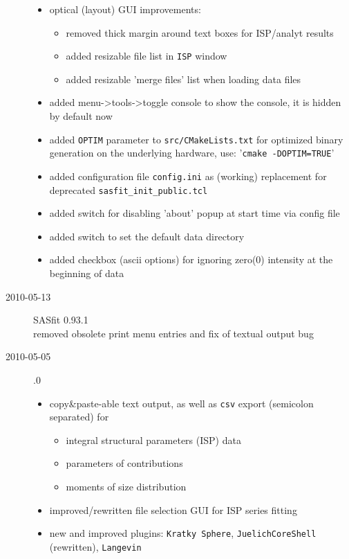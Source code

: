 \begin{description}
\begin{itemize}
        \item optical (layout) GUI improvements:
            \begin{itemize}
            \item removed thick margin around text boxes for ISP/analyt results
            \item added resizable file list in \texttt{ISP} window
            \item added resizable 'merge files' list when loading data files
            \end{itemize}
        \item added menu->tools->toggle console to show the console, it is hidden by default now
        \item added \texttt{OPTIM} parameter to \texttt{src/CMakeLists.txt} for optimized binary generation on the underlying hardware, use: '\texttt{cmake -DOPTIM=TRUE}'
        \item added configuration file \texttt{config.ini} as (working) replacement for deprecated \texttt{sasfit\_init\_public.tcl}
        \item added switch for disabling 'about' popup at start time via config file
        \item added switch to set the default data directory
        \item added checkbox (ascii options) for ignoring zero(0) intensity at the beginning of data
        \end{itemize}
    \item[2010-05-13] SASfit 0.93.1 \\
    removed obsolete print menu entries and fix of textual output bug
    \item[2010-05-05] .0
        \begin{itemize}
            \item copy\&paste-able text output, as well as \texttt{csv} export (semicolon separated) for
            \begin{itemize}
                \item integral structural parameters (ISP) data
                \item parameters of contributions
                \item moments of size distribution
            \end{itemize}
            \item  improved/rewritten file selection GUI for ISP series fitting
            \item  new and improved plugins: \texttt{Kratky Sphere}, \texttt{JuelichCoreShell} (rewritten), \texttt{Langevin}

\end{itemize}
\end{description}
